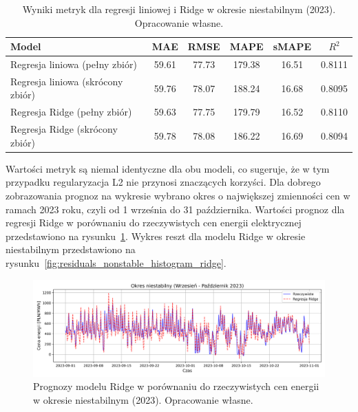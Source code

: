 \begin{table}[H]
    \centering
        \caption{Wyniki metryk dla regresji liniowej i Ridge w okresie niestabilnym (2023). Opracowanie własne.}
        \label{tab:linear_regression_results}
        \begin{tabular}{|l|c|c|c|c|c|}
            \hline
            \textbf{Model} & \textbf{MAE} & \textbf{RMSE} & \textbf{MAPE} & \textbf{sMAPE} & \textbf{\(R^2\)} \\
            \hline
            Regresja liniowa (pełny zbiór) & 59.61 & 77.73 & 179.38 & 16.51 & 0.8111 \\
            Regresja liniowa (skrócony zbiór) & 59.76 & 78.07 & 188.24 & 16.68 & 0.8095 \\
            Regresja Ridge (pełny zbiór) & 59.63 & 77.75 & 179.79 & 16.52 & 0.8110 \\
            Regresja Ridge (skrócony zbiór) & 59.78 & 78.08 & 186.22 & 16.69 & 0.8094 \\
            \hline
        \end{tabular}
\end{table}

Wartości metryk są niemal identyczne dla obu modeli, co sugeruje, że w tym przypadku regularyzacja L2 nie przynosi znaczących korzyści.\newline
Dla dobrego zobrazowania prognoz na wykresie wybrano okres o największej zmienności cen w ramach 2023 roku, czyli od 1 września do 31 października. Wartości prognoz dla regresji Ridge w porównaniu do rzeczywistych cen energii elektrycznej przedstawiono na rysunku~\ref{fig:ridge_predictions_full_sep_oct_2023}. Wykres reszt dla modelu Ridge w okresie niestabilnym przedstawiono na rysunku~\ref{fig:residuals_nonstable_histogram_ridge}.

\begin{figure}[H]
    \centering
    \includegraphics[width=1.0\textwidth]{../../plots/predicts/ridge_predictions_full_sep_oct_2023.png}
    \caption{Prognozy modelu Ridge w porównaniu do rzeczywistych cen energii w okresie niestabilnym (2023). Opracowanie własne.}
    \label{fig:ridge_predictions_full_sep_oct_2023}
\end{figure}

